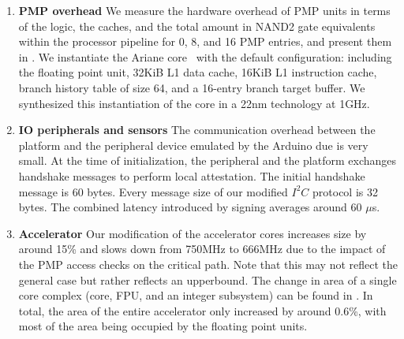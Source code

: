 \begin{enumerate}
\begin{table}[tbp]
    \label{tab:eval:ariane}
\end{table}


\item \textbf{PMP overhead}
We measure the hardware overhead of PMP units in terms of the logic, the caches, and the total amount in NAND2 gate equivalents within the processor pipeline for 0, 8, and 16 PMP entries, and present them in . We instantiate the Ariane core~\cite{ariane} with the default configuration: including the floating point unit, 32KiB L1 data cache, 16KiB L1 instruction cache, branch history table of size 64, and a 16-entry branch target buffer. We synthesized this instantiation of the core in a 22nm technology at 1GHz. %

\item \textbf{IO peripherals and sensors} The communication overhead between the platform and the peripheral device emulated by the Arduino due is very small. At the time of initialization, the peripheral and the platform exchanges handshake messages to perform local attestation. The initial handshake message is $60$ bytes. Every message size of our modified $I^2C$ protocol is 32 bytes. The combined latency introduced by signing averages around 60 $\mu$s.

\item \textbf{Accelerator} Our modification of the accelerator cores increases size by around 15\% and slows down from 750MHz to 666MHz due to the impact of the PMP access checks on the critical path. Note that this may not reflect the general case but rather reflects an upperbound. The change in area of a single core complex (core, FPU, and an integer subsystem) can be found in . In total, the area of the entire accelerator only increased by around 0.6\%, with most of the area being occupied by the floating point units.
\end{enumerate}



